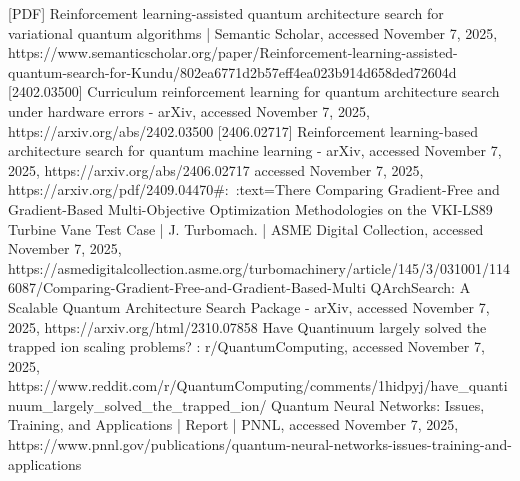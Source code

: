 \documentclass[12pt,a4paper]{article}
\begin{document}
[PDF] Reinforcement learning-assisted quantum architecture search for variational quantum algorithms | Semantic Scholar, accessed November 7, 2025, https://www.semanticscholar.org/paper/Reinforcement-learning-assisted-quantum-search-for-Kundu/802ea6771d2b57eff4ea023b914d658ded72604d
[2402.03500] Curriculum reinforcement learning for quantum architecture search under hardware errors - arXiv, accessed November 7, 2025, https://arxiv.org/abs/2402.03500
[2406.02717] Reinforcement learning-based architecture search for quantum machine learning - arXiv, accessed November 7, 2025, https://arxiv.org/abs/2406.02717
accessed November 7, 2025, https://arxiv.org/pdf/2409.04470#:~:text=There%
Comparing Gradient-Free and Gradient-Based Multi-Objective Optimization Methodologies on the VKI-LS89 Turbine Vane Test Case | J. Turbomach. | ASME Digital Collection, accessed November 7, 2025, https://asmedigitalcollection.asme.org/turbomachinery/article/145/3/031001/1146087/Comparing-Gradient-Free-and-Gradient-Based-Multi
QArchSearch: A Scalable Quantum Architecture Search Package - arXiv, accessed November 7, 2025, https://arxiv.org/html/2310.07858
Have Quantinuum largely solved the trapped ion scaling problems? : r/QuantumComputing, accessed November 7, 2025, https://www.reddit.com/r/QuantumComputing/comments/1hidpyj/have_quantinuum_largely_solved_the_trapped_ion/
Quantum Neural Networks: Issues, Training, and Applications | Report | PNNL, accessed November 7, 2025, https://www.pnnl.gov/publications/quantum-neural-networks-issues-training-and-applications
\end{document}
